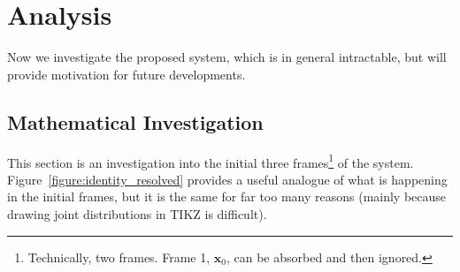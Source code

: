 \chapter{Analysis}
\label{chapter:analysis}

Now we investigate the proposed system, which is in general intractable, but will provide motivation for future developments.

\section{Mathematical Investigation}
\label{section:mathematical development}
This section is an investigation into the initial three frames\footnote{Technically, two frames. Frame 1, $\pmb{x}_0$, can be absorbed and then ignored.} of the system. Figure~\ref{figure:identity_resolved} provides a useful analogue of what is happening in the initial frames, but it is the same for far too many reasons (mainly because drawing joint distributions in TIKZ is difficult). 

